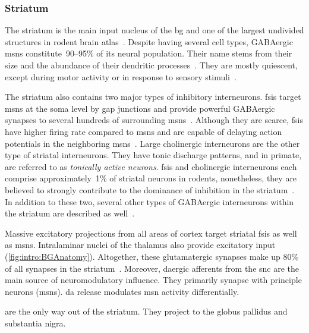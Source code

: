 \subsubsection{Striatum} \label{intro:anatomy:striatum}
The striatum is the main input nucleus of the \gls{bg} and one of the largest undivided structures in rodent brain atlas~\cite{Hintiryan2016NN}.
Despite having several cell types, GABAergic \glspl{msn} constitute~90--95\% of its neural population.
Their name stems from their size and the abundance of their dendritic processes~\cite{TURNER2000BasalFunction}.
They are mostly quiescent, except during  motor activity or in response to sensory stimuli~\cite{KandelBook2001}.
\par
The striatum also contains two major types of inhibitory interneurons.
\Glspl{fsi} target \glspl{msn} at the soma level by gap junctions and provide powerful GABAergic synapses to several hundreds of surrounding \glspl{msn}~\cite{Grillner2016BG, Gage2010FSI}.
Although they are scarce, \glspl{fsi} have higher firing rate compared to \glspl{msn} and are capable of delaying action potentials in the neighboring \glspl{msn}~\cite{Wilson2007GABAergicNeostriatum}.
Large cholinergic interneurons are the other type of striatal interneurons.
They have tonic discharge patterns, and in primate, are referred to as \textit{tonically active neurons}.
\Glspl{fsi} and cholinergic interneurons each comprise approximately~1\% of striatal neurons in rodents, nonetheless, they are believed to strongly contribute to the dominance of inhibition in the striatum~\cite{Gage2010FSI}.
In addition to these two, several other types of GABAergic interneurons within the striatum are described as well~\cite{Grillner2016BG}.
\par
Massive excitatory projections from all areas of cortex target striatal \glspl{fsi} as well as \glspl{msn}.
Intralaminar nuclei of the thalamus also provide excitatory input (\autoref{fig:intro:BGAnatomy}).
Altogether, these glutamatergic synapses make up 80\% of all synapses in the striatum~\cite{Wilson2007GABAergicNeostriatum}.
Moreover, \gls{da}ergic afferents from the \gls{snc} are the main source of neuromodulatory influence.
They primarily synapse with principle neurons (\glspl{msn}).
\Gls{da} release modulates \gls{msn} activity differentially.
\par
{} are the only way out of the striatum.
They project to the globus pallidus and substantia nigra.
